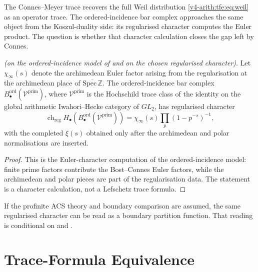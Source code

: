 The Connes--Meyer trace recovers the full Weil distribution
\eqref{v4-arith:tfe:eq:weil} as an operator trace. The ordered-incidence
bar complex approaches the same object from the Koszul-duality side:
its regularised character computes the Euler product. The question is
whether that character calculation closes the gap left by Connes.

\begin{proposition}
\label{v4-arith:tfe:lem:ord-bar}
\ClaimStatusProvedHereConditional \emph{(on the ordered-incidence
model of  and on the chosen
regularised character)}. Let \(\chi_\infty(s)\) denote the
archimedean Euler factor arising from the regularisation at the
archimedean place of \(\overline{\mathrm{Spec}\,\mathbb{Z}}\). The
ordered-incidence bar complex
\(B^{\mathrm{ord}}_\bullet(\mathcal{V}^{\mathrm{prim}})\),
where \(\mathcal{V}^{\mathrm{prim}}\) is the Hochschild trace class
of the identity on the global arithmetic Iwahori--Hecke category of
\(GL_2\), has regularised character
\begin{equation}
\label{v4-arith:tfe:eq:ord-bar-product}
\operatorname{ch}_{\mathrm{reg}}
H_\bullet(B^{\mathrm{ord}}_\bullet(\mathcal V^{\mathrm{prim}}))
=
\chi_\infty(s)\prod_p(1-p^{-s})^{-1},
\end{equation}
with the completed \(\xi(s)\) obtained only after the archimedean and
polar normalisations are inserted.
\end{proposition}

\begin{proof}
This is the Euler-character computation of the ordered-incidence model:
finite prime factors contribute the Bost--Connes Euler factors, while
the archimedean and polar pieces are part of the regularisation data.
The statement is a character calculation, not a Lefschetz trace formula.
\end{proof}

\begin{remark}
\label{v4-arith:tfe:rem:canq}
If the profinite ACS theory and boundary comparison are assumed, the
same regularised character can be read as a boundary partition function.
That reading is conditional on
 and
.
\end{remark}

\section{Trace-Formula Equivalence}
\label{v4-arith:tfe:equiv}

